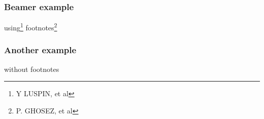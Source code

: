 \documentclass[xcolor={dvipsnames}]{beamer}
\begin{document}
\begin{frame}
\frametitle{Beamer example}
using\footnote{Y LUSPIN, et al} footnotes\footnote{P. GHOSEZ, et al}
\end{frame}
\begin{frame}
\frametitle{Another example}
without footnotes
\end{frame}
\end{document}
